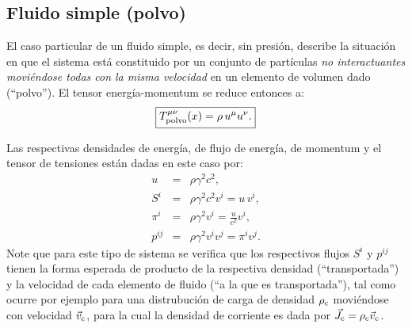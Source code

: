 \subsection{Fluido simple (polvo)}

El caso particular de un fluido simple, es decir, sin presión, describe la situación en que el sistema está constituido por  un conjunto de partículas \textit{no interactuantes moviéndose todas con la misma velocidad} en un elemento de volumen dado (``polvo''). El tensor energía-momentum se reduce entonces a:
\begin{equation}
\boxed{T_{\rm polvo}^{\mu\nu}(x)=\rho\, u^\mu u^\nu.}
\end{equation}

Las respectivas densidades de energía, de flujo de energía, de momentum y el
tensor de tensiones están dadas en este caso por:
\begin{eqnarray}
u&=&\rho \gamma^2 c^2, \\ 
S^i&=&\rho \gamma^2c^2v^i=u\,v^i, \\ 
{\pi}^i&=&\rho \gamma^2v^i =\frac{u}{c^2}v^i, \\ 
p^{ij} &=&\rho \gamma^2 v^i v^j=\pi^iv^j.
\end{eqnarray}
Note que para este tipo de sistema se verifica que los respectivos flujos $S^i$ y $p^{ij}$ tienen la forma esperada de producto de la respectiva densidad (``transportada'') y la velocidad de cada elemento de fluido (``a la que es transportada''), tal como ocurre por ejemplo para una distrubución de carga de densidad $\rho_{\rm c}$ moviéndose con velocidad $\vec{v}_{\rm c}$, para la cual la densidad de corriente es dada por $\vec{J}_{\rm c}=\rho_{\rm c}\vec{v}_{\rm c}$.

